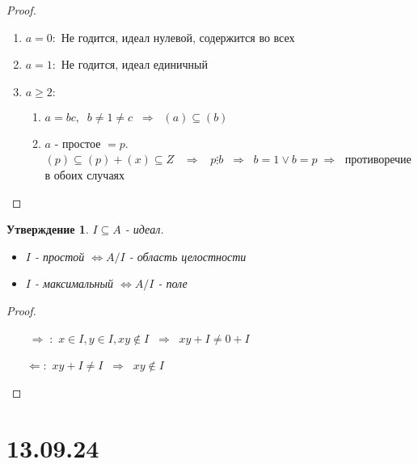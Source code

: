 \documentclass[12pt, a4paper]{article}
\newcommand{\lra}{\Leftrightarrow}
\newcommand{\ra}{\;\Rightarrow\;}
\newcommand{\la}{\Leftarrow}
\theoremstyle{plain}
\newtheorem*{Statement*}{Утверждение}
\theoremstyle{definition}
\begin{document}
\begin{proof}~\
    \begin{enumerate}
        \item $a=0:$ Не годится, идеал нулевой, содержится во всех
        \item $a=1:$ Не годится, идеал единичный
        \item $a\geqslant2:$ 
            \begin{enumerate}[label*=\arabic*.]
                \item $a = bc,\;\; b\neq 1\neq c \; \ra\; (a)\subseteq (b)$
                \item $a$ - простое $ = p$.  $(p)\subseteq(p)+(x)\subseteq Z\;\; \ra\; \; p\vdots b \; \ra \; b = 1 \vee b = p\ra$ противоречие в обоих случаях
            \end{enumerate}
    \end{enumerate}
\end{proof}
\begin{Statement*}
    $I\subseteq A$ - идеал.
    \begin{itemize}
        \item $I$ - простой $\lra A/I$ - область целостности
        \item $I$ - максимальный $\lra A/I$ - поле
    \end{itemize}
\end{Statement*}
\begin{proof}~\
    \begin{itemize}
        \item[$\ra:$]  $x\in I, y\in I, xy\notin I\; \ra \; xy+I\neq 0+I$
        \item[$\la:$]  $xy+I\neq I\; \ra \; xy\notin I$
\end{itemize}
\end{proof}
\section*{13.09.24}
\hypertarget{p4}{}
\end{document}
